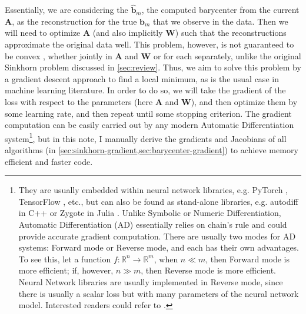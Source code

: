 Essentially, we are considering the $\widehat{\mathbf{b}}_m$,
the computed barycenter from the current $\mathbf{A}$,
as the reconstruction for the true $\mathbf{b}_m$ that we observe in the data.
Then we will need to optimize $\mathbf{A}$ (and also implicitly $\mathbf{W}$)
such that the reconstructions approximate the original data well.
This problem, however, is not guaranteed to be convex \citep{schmitz2018},
whether jointly in $\mathbf{A}$ and $\mathbf{W}$ or for each separately,
unlike the original Sinkhorn problem discussed in \cref{sec:review}.
Thus, we aim to solve this problem by a gradient descent approach to find a local minimum,
as is the usual case in machine learning literature.
In order to do so, we will take the gradient of the loss with respect to the parameters
(here $\mathbf{A}$ and $\mathbf{W}$), and then optimize them by some learning rate,
and then repeat until some stopping criterion.
The gradient computation can be easily carried out by any modern Automatic Differentiation system\footnote{
  They are usually embedded within neural network libraries, e.g. PyTorch \citep{paszke2017}, TensorFlow \citep{abadi2016}, etc.,
  but can also be found as stand-alone libraries, e.g. autodiff in C++ \citep{leal2018} or Zygote in Julia \citep{innes2019}.
  Unlike Symbolic or Numeric Differentiation, Automatic Differentiation (AD) essentially relies on chain's rule
  and could provide accurate gradient computation.
  There are usually two modes for AD systems: Forward mode or Reverse mode, and each has their own advantages.
  To see this,
  let a function $f: \mathbb{R}^n \to \mathbb{R}^m$, when $n \ll m$, then Forward mode is more efficient;
  if, however, $n \gg m$, then Reverse mode is more efficient.
  Neural Network libraries are usually implemented in Reverse mode,
  since there is usually a scalar loss but with many parameters of the neural network model.
  Interested readers could refer to \citet[Chapter 8]{nocedal2006}.
},
but in this note, I manually derive the gradients and Jacobians of all algorithms
(in \cref{sec:sinkhorn-gradient,sec:barycenter-gradient}) to achieve memory efficient and faster code.


